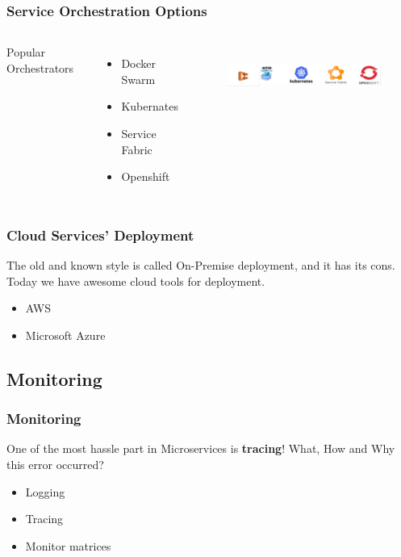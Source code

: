 \documentclass{beamer}
\begin{document}
		\begin{frame}
			\frametitle{Service Orchestration Options}
				\begin{columns}[c]
						Popular Orchestrators
						\begin{itemize}
							\item Docker Swarm
							\item Kubernates
							\item Service Fabric
							\item Openshift
						\end{itemize}
					
						\begin{figure}[h]
							\includegraphics[width=70mm, height=20mm, scale=1]{img/service-orch.png}
						\end{figure}\vspace{1mm}
				\end{columns}
			
		\end{frame}
	
		\begin{frame}
			\frametitle{Cloud Services' Deployment}
				The old and known style is called On-Premise deployment, and it has its cons.\\
				Today we have awesome cloud tools for deployment.
				\begin{itemize}
					\item AWS
					\item Microsoft Azure
				\end{itemize}
				\vspace{100mm}
		\end{frame}

	\subsection {Monitoring}
		\begin{frame}
			\frametitle{Monitoring}
				One of the most hassle part in Microservices is \textbf{tracing}! What, How and Why this error occurred? 
				\begin{itemize}
					\item Logging 
					\item Tracing
					\item Monitor matrices 
				\end{itemize}
			\vspace{100mm}
		\end{frame}
	
\end{document}
